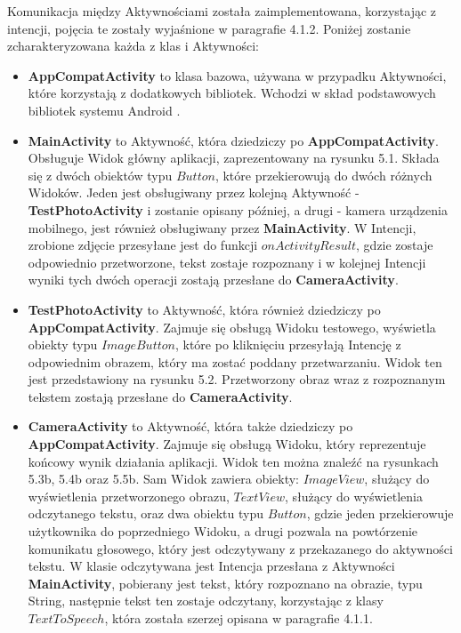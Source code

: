 \documentclass[eng,oneside]{mgr}
\begin{document}
\par Komunikacja między Aktywnościami została zaimplementowana, korzystając z intencji, pojęcia te zostały wyjaśnione w paragrafie 4.1.2. Poniżej zostanie zcharakteryzowana każda z klas i Aktywności:
\begin{itemize}
\item \textbf{AppCompatActivity} to klasa bazowa, używana w przypadku Aktywności, które korzystają z dodatkowych bibliotek. Wchodzi w skład podstawowych bibliotek systemu Android \cite{appcompat}. 
\item \textbf{MainActivity} to Aktywność, która dziedziczy po \textbf{AppCompatActivity}. Obsługuje Widok główny aplikacji, zaprezentowany na rysunku 5.1. Składa się z dwóch obiektów typu $Button$, które przekierowują do dwóch różnych Widoków. Jeden jest obsługiwany przez kolejną Aktywność - \textbf{TestPhotoActivity} i zostanie opisany później, a drugi - kamera urządzenia mobilnego, jest również obsługiwany przez \textbf{MainActivity}. W Intencji, zrobione zdjęcie przesyłane jest do funkcji $onActivityResult$, gdzie zostaje odpowiednio przetworzone, tekst zostaje rozpoznany i w kolejnej Intencji wyniki tych dwóch operacji zostają przesłane do \textbf{CameraActivity}.
\item \textbf{TestPhotoActivity} to Aktywność, która również dziedziczy po \textbf{AppCompatActivity}. Zajmuje się obsługą Widoku testowego, wyświetla obiekty typu $ImageButton$, które po kliknięciu przesyłają Intencję z odpowiednim obrazem, który ma zostać poddany przetwarzaniu. Widok ten jest przedstawiony na rysunku 5.2. Przetworzony obraz wraz z rozpoznanym tekstem zostają przesłane do \textbf{CameraActivity}.
\item \textbf{CameraActivity} to Aktywność, która także dziedziczy po \textbf{AppCompatActivity}. Zajmuje się obsługą Widoku, który reprezentuje końcowy wynik działania aplikacji. Widok ten można znaleźć na rysunkach 5.3b, 5.4b oraz 5.5b. Sam Widok zawiera obiekty: $ImageView$, służący do wyświetlenia przetworzonego obrazu, $TextView$, służący do wyświetlenia odczytanego tekstu, oraz dwa obiektu typu $Button$, gdzie jeden przekierowuje użytkownika do poprzedniego Widoku, a drugi pozwala na powtórzenie komunikatu głosowego, który jest odczytywany z przekazanego do aktywności tekstu. W klasie odczytywana jest Intencja przesłana z Aktywności \textbf{MainActivity}, pobierany jest tekst, który rozpoznano na obrazie, typu String, następnie tekst ten zostaje odczytany, korzystając z klasy $TextToSpeech$, która została szerzej opisana w paragrafie 4.1.1.

\end{itemize}
\end{document}
